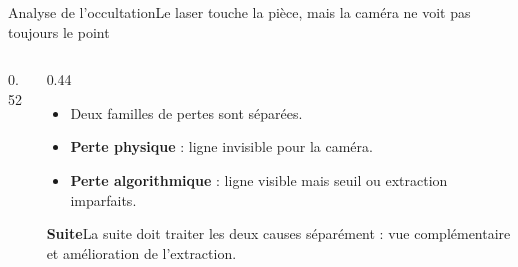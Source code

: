 \documentclass[aspectratio=169,10pt]{beamer}
\newcommand{\nextbox}[1]{%
  \begin{beamercolorbox}[wd=\linewidth,sep=0.25cm,rounded=true]{}
    \colorbox{softblue}{%
      \parbox{\dimexpr\linewidth-0.5cm\relax}{\textbf{\textcolor{deepblue}{Suite}}\quad #1}%
    }
  \end{beamercolorbox}
}
\begin{document}
\begin{frame}{Analyse de l'occultation}{Le laser touche la pièce, mais la caméra ne voit pas toujours le point}
  \begin{columns}[T,onlytextwidth]
    \begin{column}{0.52\textwidth}
      
    \end{column}
    \begin{column}{0.44\textwidth}
      \begin{itemize}
        \item Deux familles de pertes sont séparées.
        \item \textbf{Perte physique} : ligne invisible pour la caméra.
        \item \textbf{Perte algorithmique} : ligne visible mais seuil ou extraction imparfaits.
      \end{itemize}

      \vspace{0.25cm}
      \nextbox{La suite doit traiter les deux causes séparément : vue complémentaire et amélioration de l'extraction.}
    \end{column}
  \end{columns}
\end{frame}
\end{document}
